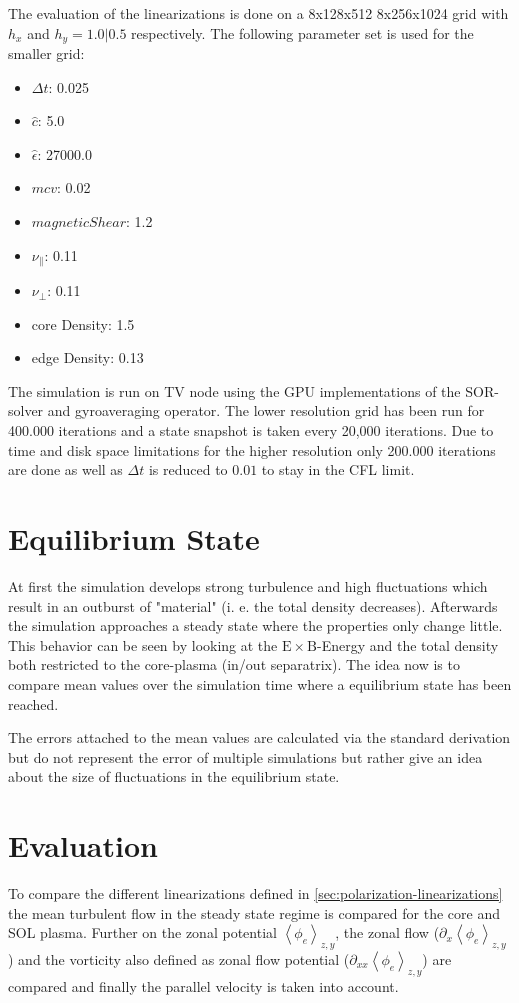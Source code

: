\documentclass[master.tex]{subfiles}
\newcommand{\meanxy}[1]{\left<#1\right>_{z,y}}
\begin{document}
The evaluation of the linearizations is done on a 8x128x512 8x256x1024 grid with $h_x$ and $h_y=1.0|0.5$ respectively. The following parameter set is used for the smaller grid:
\begin{itemize}
    \item $\Delta t$: 0.025
    \item $\hat{c}$: 5.0
    \item $\hat{\epsilon}$: 27000.0
    \item $mcv$: 0.02
    \item $magnetic Shear$: 1.2
    \item $\nu_{\parallel}$: 0.11
    \item $\nu_{\perp}$: 0.11
    \item core Density: 1.5
    \item edge Density: 0.13
\end{itemize}
The simulation is run on \ac{TV} node using the GPU implementations of the \ac{SOR}-solver and gyroaveraging operator. The lower resolution grid has been run for 400.000 iterations and a state snapshot is taken every 20,000 iterations. Due to time and disk space limitations for the higher resolution only 200.000 iterations are done as well as $\Delta t$ is reduced to $0.01$ to stay in the \ac{CFL} limit.

\section{Equilibrium State}
At first the simulation develops strong turbulence and high fluctuations which result in an outburst of "material" (i. e. the total density decreases). Afterwards the simulation approaches a steady state where the properties only change little.  This behavior can be seen by looking at the $\mathrm{E} \times \mathrm{B}$-Energy and the total density both restricted to the core-plasma (in/out separatrix). The idea now is to compare mean values over the simulation time where a equilibrium state has been reached. 

The errors attached to the mean values are calculated via the standard derivation but do not represent the error of multiple simulations but rather give an idea about the size of fluctuations in the equilibrium state.

\section{Evaluation}
To compare the different linearizations defined in \autoref{sec:polarization-linearizations} the mean turbulent flow in the steady state regime is compared for the core and \ac{SOL} plasma. Further on the zonal potential  $\meanxy{\phi_e}$, the zonal flow ($\partial_x \meanxy{\phi_e}$) and the vorticity also defined as zonal flow potential ($\partial_{xx}\meanxy{\phi_e}$) are compared and finally the parallel velocity is taken into account.
\end{document}
